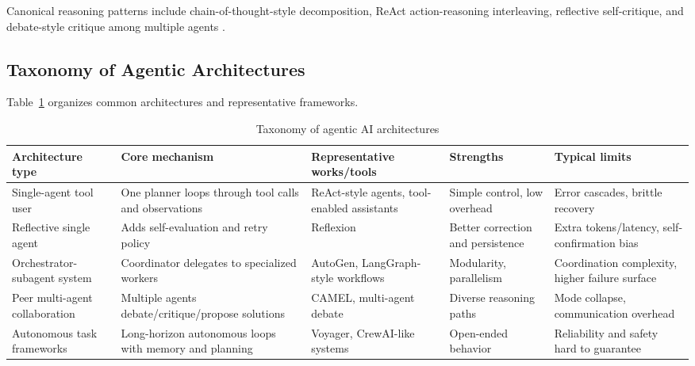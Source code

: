\documentclass[conference]{IEEEtran}
\begin{document}
Canonical reasoning patterns include chain-of-thought-style decomposition, ReAct action-reasoning interleaving, reflective self-critique, and debate-style critique among multiple agents \cite{wei2022chain, yao2023react, shinn2023reflexion, du2024debate}.

\subsection{Taxonomy of Agentic Architectures}
Table~\ref{tab:agent-taxonomy} organizes common architectures and representative frameworks.

\begin{table}[t]
\centering
\small
\caption{Taxonomy of agentic AI architectures}
\label{tab:agent-taxonomy}
\begin{tabular}{p{3.0cm} p{3.2cm} p{3.6cm} p{2.8cm} p{2.8cm}}
\toprule
Architecture type & Core mechanism & Representative works/tools & Strengths & Typical limits \\
\midrule
Single-agent tool user & One planner loops through tool calls and observations & ReAct-style agents, tool-enabled assistants \cite{yao2023react} & Simple control, low overhead & Error cascades, brittle recovery \\

Reflective single agent & Adds self-evaluation and retry policy & Reflexion \cite{shinn2023reflexion} & Better correction and persistence & Extra tokens/latency, self-confirmation bias \\

Orchestrator-subagent system & Coordinator delegates to specialized workers & AutoGen, LangGraph-style workflows \cite{wu2023autogen, langchain2024langgraph} & Modularity, parallelism & Coordination complexity, higher failure surface \\

Peer multi-agent collaboration & Multiple agents debate/critique/propose solutions & CAMEL, multi-agent debate \cite{li2023camel, du2024debate} & Diverse reasoning paths & Mode collapse, communication overhead \\

Autonomous task frameworks & Long-horizon autonomous loops with memory and planning & Voyager, CrewAI-like systems \cite{wang2023voyager, joaomoura2024crewai} & Open-ended behavior & Reliability and safety hard to guarantee \\
\bottomrule
\end{tabular}
\end{table}
\end{document}
